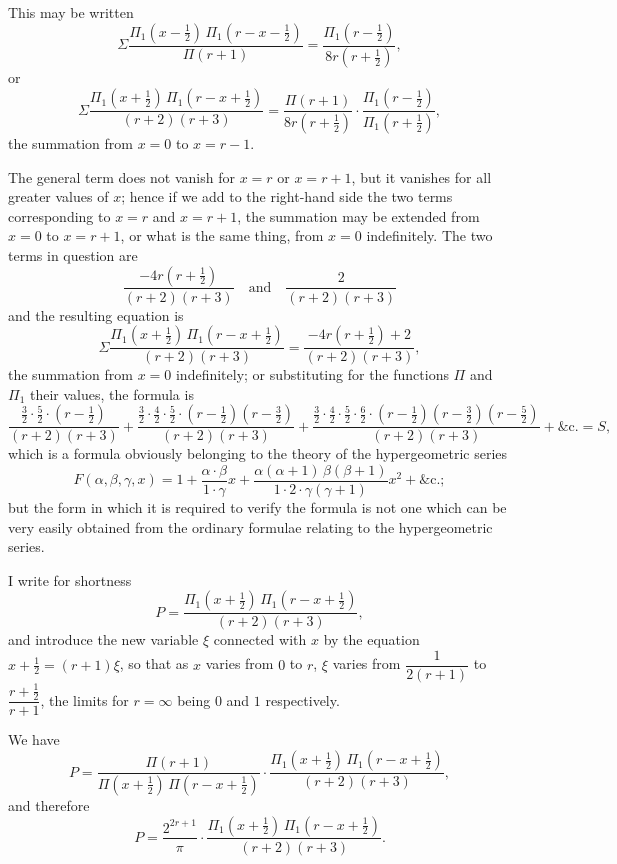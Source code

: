 \documentclass[11pt,a4paper]{article}
\theoremstyle{plain}
\begin{document}
This may be written
\[
\Sigma \frac{\Pi_1(x - \tfrac{1}{2})\,\Pi_1(r - x - \tfrac{1}{2})}{\Pi(r+1)} = \frac{\Pi_1(r - \tfrac{1}{2})}{8r(r + \tfrac{1}{2})},
\]
or
\[
\Sigma \frac{\Pi_1(x + \tfrac{1}{2})\,\Pi_1(r - x + \tfrac{1}{2})}{(r+2)(r+3)} = \frac{\Pi(r+1)}{8r(r+\tfrac{1}{2})} \cdot \frac{\Pi_1(r - \tfrac{1}{2})}{\Pi_1(r + \tfrac{1}{2})},
\]
the summation from $x=0$ to $x=r-1$.

The general term does not vanish for $x=r$ or $x=r+1$, but it vanishes for all greater values of $x$; hence if we add to the right-hand side the two terms corresponding to $x=r$ and $x=r+1$, the summation may be extended from $x=0$ to $x=r+1$, or what is the same thing, from $x=0$ indefinitely. The two terms in question are
\[
\frac{-4r(r+\tfrac{1}{2})}{(r+2)(r+3)} \quad \text{and} \quad \frac{2}{(r+2)(r+3)}
\]
and the resulting equation is
\[
\Sigma \frac{\Pi_1(x + \tfrac{1}{2})\,\Pi_1(r - x + \tfrac{1}{2})}{(r+2)(r+3)} = \frac{-4r(r+\tfrac{1}{2}) + 2}{(r+2)(r+3)},
\]
the summation from $x=0$ indefinitely; or substituting for the functions $\Pi$ and $\Pi_1$ their values, the formula is
\[
\frac{\tfrac{3}{2} \cdot \tfrac{5}{2} \cdot (r - \tfrac{1}{2})}{(r+2)(r+3)} + \frac{\tfrac{3}{2} \cdot \tfrac{4}{2} \cdot \tfrac{5}{2} \cdot (r - \tfrac{1}{2})(r - \tfrac{3}{2})}{(r+2)(r+3)} + \frac{\tfrac{3}{2} \cdot \tfrac{4}{2} \cdot \tfrac{5}{2} \cdot \tfrac{6}{2} \cdot (r - \tfrac{1}{2})(r - \tfrac{3}{2})(r - \tfrac{5}{2})}{(r+2)(r+3)} + \&\text{c.} = S,
\]
which is a formula obviously belonging to the theory of the hypergeometric series
\[
F(\alpha, \beta, \gamma, x) = 1 + \frac{\alpha \cdot \beta}{1 \cdot \gamma}x + \frac{\alpha(\alpha+1)\,\beta(\beta+1)}{1 \cdot 2 \cdot \gamma(\gamma+1)}x^2 + \&\text{c.};
\]
but the form in which it is required to verify the formula is not one which can be very easily obtained from the ordinary formulae relating to the hypergeometric series.

I write for shortness
\[
P = \frac{\Pi_1(x + \tfrac{1}{2})\,\Pi_1(r - x + \tfrac{1}{2})}{(r+2)(r+3)},
\]
and introduce the new variable $\xi$ connected with $x$ by the equation $x + \tfrac{1}{2} = (r+1)\xi$, so that as $x$ varies from $0$ to $r$, $\xi$ varies from $\dfrac{1}{2(r+1)}$ to $\dfrac{r+\tfrac{1}{2}}{r+1}$, the limits for $r=\infty$ being $0$ and $1$ respectively.

We have
\[
P = \frac{\Pi(r+1)}{\Pi(x+\tfrac{1}{2})\,\Pi(r-x+\tfrac{1}{2})} \cdot \frac{\Pi_1(x+\tfrac{1}{2})\,\Pi_1(r-x+\tfrac{1}{2})}{(r+2)(r+3)},
\]
and therefore
\[
P = \frac{2^{2r+1}}{\pi} \cdot \frac{\Pi_1(x+\tfrac{1}{2})\,\Pi_1(r-x+\tfrac{1}{2})}{(r+2)(r+3)}.
\]
\end{document}
